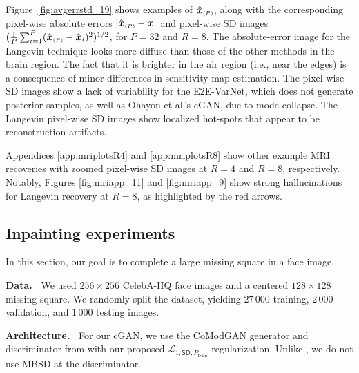 \documentclass{article}
\theoremstyle{plain}
\theoremstyle{definition}
\theoremstyle{remark}
\newcommand{\hvec}[1]{\ensuremath{\Hat{\boldsymbol{#1}}}}
\renewcommand{\vec}[1]{\ensuremath{\boldsymbol{#1}}}
\newcommand{\mc}[1]{\ensuremath{\mathcal{#1}}}
\newcommand{\Figref}[1]{Figure~\ref{fig:#1}}
\newcommand{\train}{_{\mathsf{train}}}
\newcommand{\LonestdPt}{\mc{L}_{1,\mathsf{SD},P\train}}
\newcommand{\avgP}{_{\scriptscriptstyle (P)}}
\begin{document}
\Figref{avgerrstd_19} shows examples of $\hvec{x}\avgP$, along with the corresponding pixel-wise absolute errors $|\hvec{x}\avgP-\vec{x}|$ and pixel-wise SD images $(\frac{1}{P}\sum_{i=1}^P (\hvec{x}\avgP-\hvec{x}_i)^2)^{1/2}$, for $P=32$ and $R=8$.
The absolute-error image for the Langevin technique looks more diffuse than those of the other methods in the brain region.
The fact that it is brighter in the air region (i.e., near the edges) is a consequence of minor differences in sensitivity-map estimation.
The pixel-wise SD images show a lack of variability for the E2E-VarNet, which does not generate posterior samples, as well as Ohayon et al.'s cGAN, due to mode collapse.
The Langevin pixel-wise SD images show localized hot-spots that appear to be reconstruction artifacts. 

Appendices \ref{app:mriplotsR4} and \ref{app:mriplotsR8} show other example MRI recoveries with zoomed pixel-wise SD images at $R=4$ and $R=8$, respectively. 
Notably, Figures \ref{fig:mriapp_11} and \ref{fig:mriapp_9} show strong hallucinations for Langevin recovery at $R=8$, as highlighted by the red arrows.

\subsection{Inpainting experiments} \label{sec:inpainting}
In this section, our goal is to complete a large missing square in a face image.

\textbf{Data.~}
We used $256 \times 256$ CelebA-HQ face images \cite{Karras:ICLR:18} and a centered $128\times 128$ missing square.
We randomly split the dataset, yielding $27\,000$ training, $2\,000$ validation, and $1\,000$ testing images. 

\textbf{Architecture.~} 
For our cGAN, we use the CoModGAN generator and discriminator from \cite{Zhao:ICLR:21} with our proposed $\LonestdPt$ regularization. Unlike \cite{Zhao:ICLR:21}, we do not use MBSD \cite{Karras:ICLR:18} at the discriminator.
\end{document}
